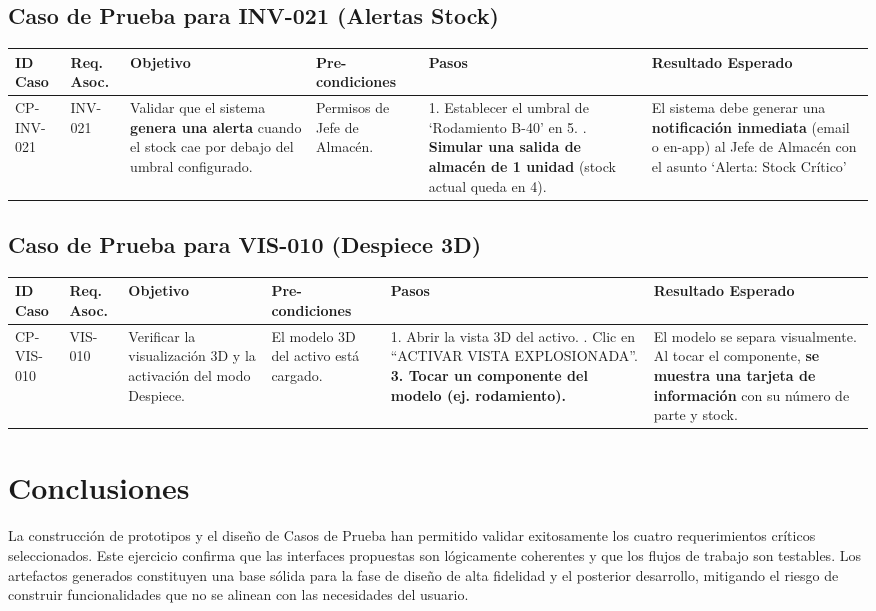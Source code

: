 \subsection{Caso de Prueba para INV-021 (Alertas Stock)}

\footnotesize
\begin{longtable}{|p{2cm}|p{2cm}|p{3cm}|p{2.5cm}|p{3cm}|p{3cm}|}
\hline
\textbf{ID Caso} & \textbf{Req. Asoc.} & \textbf{Objetivo} & \textbf{Pre-condiciones} & \textbf{Pasos} & \textbf{Resultado Esperado} \\ \hline
CP-INV-021 & INV-021 & Validar que el sistema \textbf{genera una alerta} cuando el stock cae por debajo del umbral configurado. & Permisos de Jefe de Almacén. & 1. Establecer el umbral de `Rodamiento B-40' en 5. \newline 2. \textbf{Simular una salida de almacén de 1 unidad} (stock actual queda en 4). & El sistema debe generar una \textbf{notificación inmediata} (email o en-app) al Jefe de Almacén con el asunto `Alerta: Stock Crítico' \\ \hline
\end{longtable}
\normalsize

\subsection{Caso de Prueba para VIS-010 (Despiece 3D)}

\footnotesize
\begin{longtable}{|p{2cm}|p{2cm}|p{3cm}|p{2.5cm}|p{3cm}|p{3cm}|}
\hline
\textbf{ID Caso} & \textbf{Req. Asoc.} & \textbf{Objetivo} & \textbf{Pre-condiciones} & \textbf{Pasos} & \textbf{Resultado Esperado} \\ \hline
CP-VIS-010 & VIS-010 & Verificar la visualización 3D y la activación del modo Despiece. & El modelo 3D del activo está cargado. & 1. Abrir la vista 3D del activo. \newline 2. Clic en ``ACTIVAR VISTA EXPLOSIONADA''. \newline \textbf{3. Tocar un componente del modelo (ej. rodamiento).} & El modelo se separa visualmente. Al tocar el componente, \textbf{se muestra una tarjeta de información} con su número de parte y stock. \\ \hline
\end{longtable}
\normalsize

\section{Conclusiones}

La construcción de prototipos y el diseño de Casos de Prueba han permitido validar exitosamente los cuatro requerimientos críticos seleccionados. Este ejercicio confirma que las interfaces propuestas son lógicamente coherentes y que los flujos de trabajo son testables. Los artefactos generados constituyen una base sólida para la fase de diseño de alta fidelidad y el posterior desarrollo, mitigando el riesgo de construir funcionalidades que no se alinean con las necesidades del usuario.
